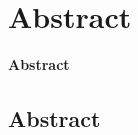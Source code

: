 \documentclass["WS\space 16-17\space -\space LaTeX-Kurs\space -\space Praesentation\space -\space 3.tex"]{subfiles}
\begin{document}
\section{Abstract}
\begin{frame}[c]
	\begin{center}
		\LARGE \textbf{Abstract}
	\end{center}
\end{frame}
\subsection*{Abstract}
\end{document}
